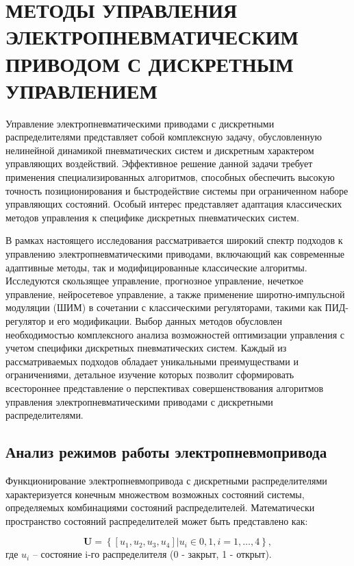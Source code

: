 \chapter{МЕТОДЫ УПРАВЛЕНИЯ ЭЛЕКТРОПНЕВМАТИЧЕСКИМ ПРИВОДОМ С ДИСКРЕТНЫМ УПРАВЛЕНИЕМ}\label{ch:ch3}
Управление электропневматическими приводами с дискретными распределителями представляет
собой комплексную задачу, обусловленную нелинейной динамикой пневматических систем и
дискретным характером управляющих воздействий. Эффективное решение данной задачи требует
применения специализированных алгоритмов, способных обеспечить высокую точность позиционирования и
быстродействие системы при ограниченном наборе управляющих состояний. Особый интерес представляет адаптация
классических методов управления к специфике дискретных пневматических систем.

В рамках настоящего исследования рассматривается широкий спектр подходов к управлению электропневматическими
приводами, включающий как современные адаптивные методы, так и модифицированные
классические алгоритмы. Исследуются скользящее управление, прогнозное управление,
нечеткое управление, нейросетевое управление, а также применение широтно-импульсной модуляции (ШИМ)
в сочетании с классическими регуляторами, такими как ПИД-регулятор и его модификации.
Выбор данных методов обусловлен необходимостью комплексного анализа возможностей оптимизации управления
с учетом специфики дискретных пневматических систем. Каждый из рассматриваемых подходов обладает
уникальными преимуществами и ограничениями, детальное изучение которых позволит сформировать
всестороннее представление о перспективах совершенствования алгоритмов управления
электропневматическими приводами с дискретными распределителями.

\section{Анализ режимов работы электропневмопривода}\label{sec:ch3/sec1}

Функционирование электропневмопривода с дискретными распределителями характеризуется конечным
множеством возможных состояний системы, определяемых комбинациями состояний распределителей.
Математически пространство состояний распределителей может быть представлено как:

\begin{equation}\label{eq:state_space}
	\mathbf{U} = \left\{
	[u_1, u_2, u_3, u_4] | u_i \in {0,1}, i = 1,\dots,4
	\right\},
\end{equation}
где $u_i$ -- состояние i-го распределителя (0 - закрыт, 1 - открыт).

